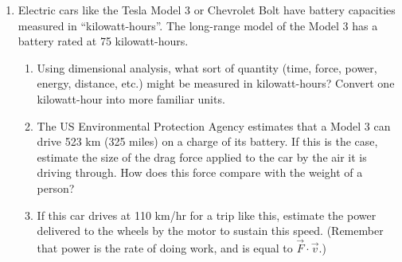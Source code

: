 \documentclass[12pt]{article}
\begin{document}
\begin{enumerate}
\item Electric cars like the Tesla Model 3 or Chevrolet Bolt have battery capacities measured in ``kilowatt-hours''. The long-range model of the Model 3 has a battery rated at 75 kilowatt-hours. 
\begin{enumerate}
	\item Using dimensional analysis, what sort of quantity (time, force, power, energy, distance, etc.) might be measured in kilowatt-hours? Convert one kilowatt-hour into more familiar units.
	\item The US Environmental Protection Agency estimates that a Model 3 can drive 523 km (325 miles) on a charge of its battery. If this is the case, estimate the size of the drag force applied to the car by the air it is driving through. How does this force
	compare with the weight of a person?
	\item If this car drives at 110 km/hr for a trip like this, estimate the power delivered to the wheels by the motor to sustain
	this speed. (Remember that power is the rate of doing work, and is equal to $\vec F \cdot \vec v$.)
\end{enumerate}




\end{enumerate}
\end{document}

